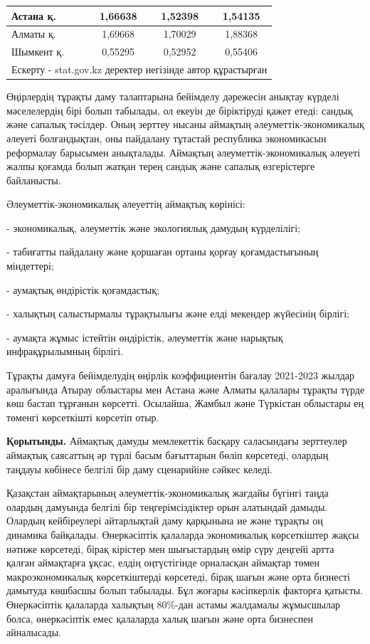 \begin{table}[H]
\begin{tabular}{|lccc|}
\multicolumn{1}{|l|}{Астана қ.}       & \multicolumn{1}{c|}{1,66638} & \multicolumn{1}{c|}{1,52398} & 1,54135 \\ \hline
\multicolumn{1}{|l|}{Алматы қ.}       & \multicolumn{1}{c|}{1,69668} & \multicolumn{1}{c|}{1,70029} & 1,88368 \\ \hline
\multicolumn{1}{|l|}{Шымкент қ.}      & \multicolumn{1}{c|}{0,55295} & \multicolumn{1}{c|}{0,52952} & 0,55406 \\ \hline
\multicolumn{4}{|l|}{Ескерту - stat.gov.kz деректер негізінде автор құрастырған}                              \\ \hline
\end{tabular}%
\end{table}

\begin{multicols}{2}
Өңірлердің тұрақты даму талаптарына бейімделу дәрежесін анықтау күрделі
мәселелердің бірі болып табылады, ол екеуін де біріктіруді қажет етеді:
сандық және сапалық тәсілдер. Оның зерттеу нысаны аймақтың
әлеуметтік-экономикалық әлеуеті болғандықтан, оны пайдалану тұтастай
республика экономикасын реформалау барысымен анықталады. Аймақтың
әлеуметтік-экономикалық әлеуеті жалпы қоғамда болып жатқан терең сандық
және сапалық өзгерістерге байланысты.

Әлеуметтік-экономикалық әлеуеттің аймақтық көрінісі:

- экономикалық, әлеуметтік және экологиялық дамудың күрделілігі;

- табиғатты пайдалану және қоршаған ортаны қорғау қоғамдастығының
міндеттері;

- аумақтық өндірістік қоғамдастық;

- халықтың салыстырмалы тұрақтылығы және елді мекендер жүйесінің
бірлігі;

- аумақта жұмыс істейтін өндірістік, әлеуметтік және нарықтық
инфрақұрылымның бірлігі.

Тұрақты дамуға бейімделудің өңірлік коэффициентін бағалау 2021-2023
жылдар аралығында Атырау облыстары мен Астана және Алматы қалалары
тұрақты түрде көш бастап тұрғанын көрсетті. Осылайша, Жамбыл және
Түркістан облыстары ең төменгі көрсеткішті көрсетіп отыр.

{\bfseries Қорытынды.} Аймақтық дамуды мемлекеттік басқару саласындағы
зерттеулер аймақтық саясаттың әр түрлі басым бағыттарын бөліп көрсетеді,
олардың таңдауы көбінесе белгілі бір даму сценарийіне сәйкес келеді.

Қазақстан аймақтарының әлеуметтік-экономикалық жағдайы бүгінгі таңда
олардың дамуында белгілі бір теңгерімсіздіктер орын алатындай дамыды.
Олардың кейбіреулері айтарлықтай даму қарқынына ие және тұрақты оң
динамика байқалады. Өнеркәсіптік қалаларда экономикалық көрсеткіштер
жақсы нәтиже көрсетеді, бірақ кірістер мен шығыстардың өмір сүру деңгейі
артта қалған аймақтарға ұқсас, елдің оңтүстігінде орналасқан аймақтар
төмен макроэкономикалық көрсеткіштерді көрсетеді, бірақ шағын және орта
бизнесті дамытуда көшбасшы болып табылады. Бұл жоғары кәсіпкерлік
факторға қатысты. Өнеркәсіптік қалаларда халықтың 80\%-дан астамы
жалдамалы жұмысшылар болса, өнеркәсіптік емес қалаларда халық шағын және
орта бизнеспен айналысады.


\end{multicols}
